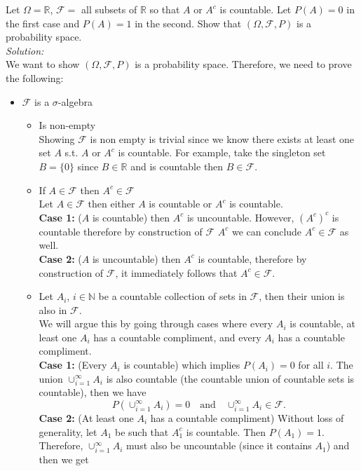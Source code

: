 \documentclass[10pt]{amsart}
\begin{document}
Let $\Omega=\mathds{R}$, $\mathcal{F}=$ all subsets of $\mathds{R}$ so that $A$ or $A^c$ is countable.
Let $P(A)=0$ in the first case and $P(A)=1$ in the second.
Show that $(\Omega, \mathcal{F}, P)$ is a probability space. \\
\textit{Solution:} \\
We want to show $(\Omega, \mathcal{F}, P)$ is a probability space. Therefore, we need to prove the following:
\begin{itemize}
\item $\mathcal{F}$ is a $\sigma$-algebra
	\begin{itemize}
		\item Is non-empty \\
		Showing $\mathcal{F}$ is non empty is trivial since we know there exists at least one set $A$ s.t. $A$ or $A^c$ is countable.
		For example, take the singleton set $B = \{0\}$ since $B \in \mathbb{R}$ and is countable then $B \in \mathcal{F}$.
		\item If $A \in \mathcal{F}$ then $A^c \in \mathcal{F}$ \\
		Let $A \in \mathcal{F}$ then either $A$ is countable or $A^c$ is countable. \\
		\textbf{Case 1:} ($A$ is countable) then $A^c$ is uncountable. 
		However, $(A^c)^c$ is countable therefore by construction of $\mathcal{F}$ $A^c$ we can conclude $A^c \in \mathcal{F}$ as well. \\
		\textbf{Case 2:} ($A$ is uncountable) then $A^c$ is countable, therefore by construction of $\mathcal{F}$, it immediately follows that $A^c \in \mathcal{F}$.
		\item Let $A_i$, $i \in \mathbb{N}$ be a countable collection of sets in $\mathcal{F}$, then their union is also in $\mathcal{F}$. \\
		We will argue this by going through cases where every $A_i$ is countable, at least one $A_i$ has a countable compliment, and every $A_i$ has a countable compliment. \\
		\textbf{Case 1:} (Every $A_i$ is countable) which implies $P(A_i) = 0$ for all $i$.
		The union $\cup_{i=1}^\infty A_i$ is also countable (the countable union of countable sets is countable), then we have
		$$ P\left(\cup_{i=1}^\infty A_i\right) = 0 \quad \text{and} \quad \cup_{i=1}^\infty A_i \in \mathcal{F}.$$
		\textbf{Case 2:} (At least one $A_i$ has a countable compliment) Without loss of generality, let $A_1$ be such that $A_1^c$ is countable.
		Then $P(A_1) = 1$. Therefore, $\cup_{i=1}^\infty A_i$ must also be uncountable (since it contains $A_1$) and then we get

\end{itemize}
\end{itemize}
\end{document}
